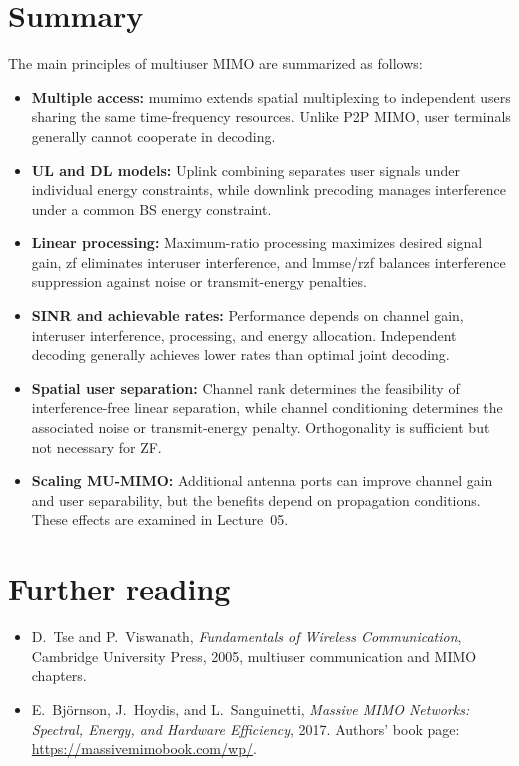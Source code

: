 \section*{Summary}
The main principles of multiuser MIMO are summarized as follows:
\begin{itemize}
	\item \textbf{Multiple access:} \Ac{mumimo} extends spatial multiplexing to independent users sharing the same time-frequency resources. Unlike P2P MIMO, user terminals generally cannot cooperate in decoding.
	
	\item \textbf{UL and DL models:} Uplink combining separates user signals under individual energy constraints, while downlink precoding manages interference under a common BS energy constraint.
	
	\item \textbf{Linear processing:} Maximum-ratio processing maximizes desired signal gain, \ac{zf} eliminates interuser interference, and \ac{lmmse}/\ac{rzf} balances interference suppression against noise or transmit-energy penalties.
	
	\item \textbf{SINR and achievable rates:} Performance depends on channel gain, interuser interference, processing, and energy allocation. Independent decoding generally achieves lower rates than optimal joint decoding.
	
	\item \textbf{Spatial user separation:} Channel rank determines the feasibility of interference-free linear separation, while channel conditioning determines the associated noise or transmit-energy penalty. Orthogonality is sufficient but not necessary for ZF.
	
	\item \textbf{Scaling MU-MIMO:} Additional antenna ports can improve channel gain and user separability, but the benefits depend on propagation conditions. These effects are examined in Lecture~05.
\end{itemize}

\section*{Further reading}
\begin{itemize}
	\item D.~Tse and P.~Viswanath, \emph{Fundamentals of Wireless Communication}, Cambridge University Press, 2005, multiuser communication and MIMO chapters.
	\item E.~Bj\"ornson, J.~Hoydis, and L.~Sanguinetti, \emph{Massive MIMO Networks: Spectral, Energy, and Hardware Efficiency}, 2017. Authors' book page: \url{https://massivemimobook.com/wp/}.
\end{itemize}


